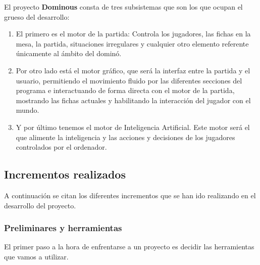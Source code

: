 El proyecto \textbf{Dominous} consta de tres subsistemas que son los que ocupan el grueso del desarrollo:
\begin{enumerate}
    \item El primero es el motor de la partida: Controla los jugadores, las fichas en la mesa, la partida, situaciones irregulares
            y cualquier otro elemento referente únicamente al ámbito del dominó.
    \item Por otro lado está el motor gráfico, que será la interfaz entre la partida y el usuario, permitiendo el movimiento
            fluido por las diferentes secciones del programa e interactuando de forma directa con el motor de la partida,
            mostrando las fichas actuales y habilitando la interacción del jugador con el mundo.
    \item Y por último tenemos el motor de Inteligencia Artificial. Este motor será el que alimente la inteligencia
            y las acciones y decisiones de los jugadores controlados por el ordenador.
\end{enumerate}



\subsection{Incrementos realizados}

A continuación se citan los diferentes incrementos que se han ido realizando en el desarrollo del proyecto.


\subsubsection{Preliminares y herramientas}

El primer paso a la hora de enfrentarse a un proyecto es decidir las herramientas que vamos a utilizar.


